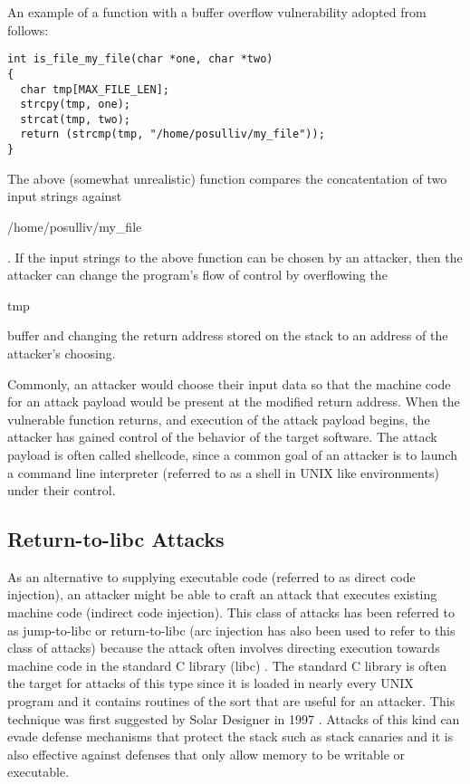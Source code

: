 An example of a function with a buffer overflow vulnerability adopted from \cite{erlingsson-07} follows:

\begin{mylisting}
\begin{verbatim}
int is_file_my_file(char *one, char *two)
{
  char tmp[MAX_FILE_LEN];
  strcpy(tmp, one);
  strcat(tmp, two);
  return (strcmp(tmp, "/home/posulliv/my_file"));
}
\end{verbatim}
\end{mylisting}

The above (somewhat unrealistic) function compares the concatentation of two input strings against
\begin{em}/home/posulliv/my\_file\end{em}. If the input strings to the above function can be chosen by an
attacker, then the attacker can change the program's flow of control by overflowing the
\begin{em}tmp\end{em} buffer and changing the return address stored on the stack to an address of
the attacker's choosing.

Commonly, an attacker would choose their input data so that the machine code for an attack payload
would be present at the modified return address. When the vulnerable function returns, and execution
of the attack payload begins, the attacker has gained control of the behavior of the target
software. The attack payload is often called shellcode, since a common goal of an attacker is to
launch a command line interpreter (referred to as a shell in UNIX like environments) under their
control.

\subsection{Return-to-libc Attacks}

As an alternative to supplying executable code (referred to as direct code injection), an attacker
might be able to craft an attack that executes existing machine code (indirect code injection). This
class of attacks has been referred to as jump-to-libc or return-to-libc (arc injection \cite{} has
also been used to refer to this class of attacks) because the attack often involves directing
execution towards machine code in the standard C library (libc) \cite{}. The standard C library is
often the target for attacks of this type since it is loaded in nearly every UNIX program and it
contains routines of the sort that are useful for an attacker. This technique was first suggested by
Solar Designer in 1997 \cite{}. Attacks of this kind can evade defense mechanisms that protect the
stack such as stack canaries and it is also effective against defenses that only allow memory to be
writable or executable.

